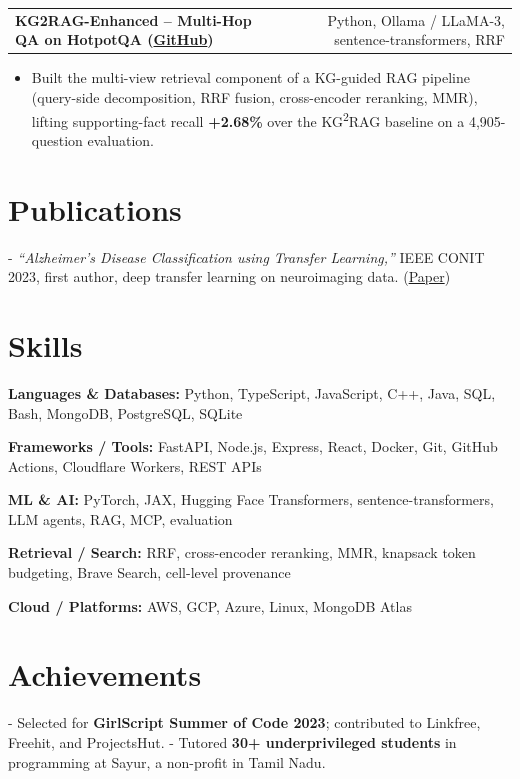 \documentclass[letterpaper,11pt]{article}
\makeatletter
\newcommand{\projItem}[2]{%
  \vspace{6pt}
  \begin{tabular*}{\textwidth}{@{}l@{\extracolsep{\fill}}r@{}}
    \textbf{#1} & #2 \\
  \end{tabular*}\par\vspace{-2pt}
}
\newcommand{\skillLine}[2]{\textbf{#1:} #2\par\vspace{2pt}}
\newcommand{\inlineBlock}[1]{{\setlength{\leftskip}{0.18in}\small #1\par}}
\makeatother
\begin{document}
\projItem{KG2RAG-Enhanced -- Multi-Hop QA on HotpotQA {\normalfont\small(\href{https://github.com/Deva-1903/KG2RAG-685-NLP}{GitHub})}}{Python, Ollama / LLaMA-3, sentence-transformers, RRF}
\begin{itemize}
  \item Built the multi-view retrieval component of a KG-guided RAG pipeline (query-side decomposition, RRF fusion, cross-encoder reranking, MMR), lifting supporting-fact recall \textbf{+2.68\%} over the KG\textsuperscript{2}RAG baseline on a 4{,}905-question evaluation.
\end{itemize}

\section{Publications}
\inlineBlock{- \textit{``Alzheimer's Disease Classification using Transfer Learning,''} IEEE CONIT 2023, first author, deep transfer learning on neuroimaging data. {\normalfont\small(\href{https://ieeexplore.ieee.org/document/10205760}{Paper})}}

\section{Skills}
\skillLine{Languages \& Databases}{Python, TypeScript, JavaScript, C++, Java, SQL, Bash, MongoDB, PostgreSQL, SQLite}
\skillLine{Frameworks / Tools}{FastAPI, Node.js, Express, React, Docker, Git, GitHub Actions, Cloudflare Workers, REST APIs}
\skillLine{ML \& AI}{PyTorch, JAX, Hugging Face Transformers, sentence-transformers, LLM agents, RAG, MCP, evaluation}
\skillLine{Retrieval / Search}{RRF, cross-encoder reranking, MMR, knapsack token budgeting, Brave Search, cell-level provenance}
\skillLine{Cloud / Platforms}{AWS, GCP, Azure, Linux, MongoDB Atlas}

\section{Achievements}
\inlineBlock{- Selected for \textbf{GirlScript Summer of Code 2023}; contributed to Linkfree, Freehit, and ProjectsHut. - Tutored \textbf{30+ underprivileged students} in programming at Sayur, a non-profit in Tamil Nadu.}
\end{document}
